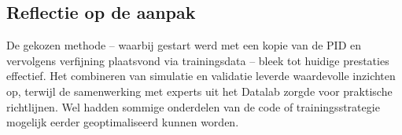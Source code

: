 \subsection{Reflectie op de aanpak}
De gekozen methode – waarbij gestart werd met een kopie van de PID en vervolgens verfijning plaatsvond via trainingsdata – bleek tot huidige prestaties effectief. Het combineren van simulatie en validatie leverde waardevolle inzichten op, terwijl de samenwerking met experts uit het Datalab zorgde voor praktische richtlijnen. Wel hadden sommige onderdelen van de code of trainingsstrategie mogelijk eerder geoptimaliseerd kunnen worden.

